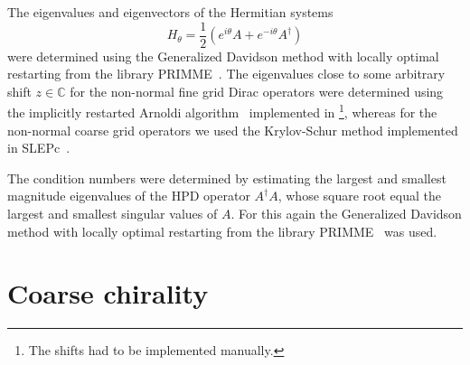 The eigenvalues and eigenvectors of the Hermitian systems
\begin{equation}
H_{\theta} = \frac{1}{2} \left(e^{i \theta} A + e^{-i \theta} A^{\dagger} \right)
\end{equation}
were determined using the Generalized Davidson method with locally optimal restarting from the library PRIMME~\cite{primme}.
The eigenvalues close to some arbitrary shift $z \in \mathbb{C}$ for the non-normal fine grid Dirac operators were determined using the implicitly restarted Arnoldi algorithm~\cite{doi:10.1137/S0895479899358595} implemented in \quda\footnote{The shifts had to be implemented manually.}, whereas for the non-normal coarse grid operators we used the Krylov-Schur method implemented in SLEPc~\cite{slepc}.

The condition numbers were determined by estimating the largest and smallest magnitude eigenvalues of the HPD operator $A^{\dagger} A$, whose square root equal the largest and smallest singular values of $A$.
For this again the Generalized Davidson method with locally optimal restarting from the library PRIMME~\cite{primme} was used.




\section{Coarse chirality}


